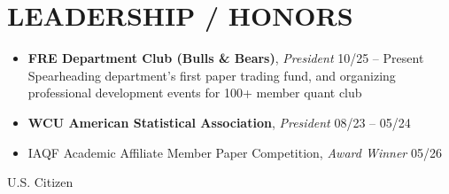 \documentclass[10pt, letterpaper]{article}
\begin{document}
\vspace{-5pt}
\section{LEADERSHIP / HONORS}

\begin{itemize}
  \item \textbf{FRE Department Club (Bulls \& Bears)}, \textit{President} \hfill 10/25 -- Present \\
    Spearheading department's first paper trading fund, and organizing professional development events for 100+ member quant club
  \item \textbf{WCU American Statistical Association}, \textit{President} \hfill 08/23 -- 05/24
  \item IAQF Academic Affiliate Member Paper Competition, \textit{Award Winner} \hfill 05/26


\end{itemize}

\vspace{2pt}
\begin{center}
  U.S. Citizen
\end{center}
\end{document}
